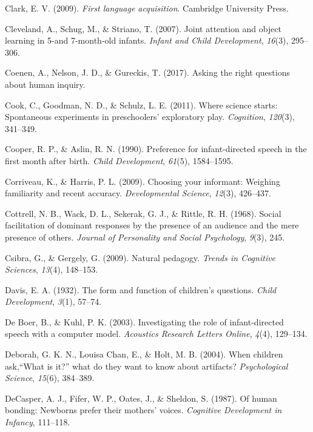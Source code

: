 \documentclass[english,floatsintext,man]{apa6}
\theoremstyle{definition}
\theoremstyle{definition}
\theoremstyle{definition}
\theoremstyle{remark}
\begin{document}
\hypertarget{ref-clark2009first}{}
Clark, E. V. (2009). \emph{First language acquisition}. Cambridge
University Press.

\hypertarget{ref-cleveland2007joint}{}
Cleveland, A., Schug, M., \& Striano, T. (2007). Joint attention and
object learning in 5-and 7-month-old infants. \emph{Infant and Child
Development}, \emph{16}(3), 295--306.

\hypertarget{ref-coenen2017asking}{}
Coenen, A., Nelson, J. D., \& Gureckis, T. (2017). Asking the right
questions about human inquiry.

\hypertarget{ref-cook2011science}{}
Cook, C., Goodman, N. D., \& Schulz, L. E. (2011). Where science starts:
Spontaneous experiments in preschoolers' exploratory play.
\emph{Cognition}, \emph{120}(3), 341--349.

\hypertarget{ref-cooper1990preference}{}
Cooper, R. P., \& Aslin, R. N. (1990). Preference for infant-directed
speech in the first month after birth. \emph{Child Development},
\emph{61}(5), 1584--1595.

\hypertarget{ref-corriveau2009choosing}{}
Corriveau, K., \& Harris, P. L. (2009). Choosing your informant:
Weighing familiarity and recent accuracy. \emph{Developmental Science},
\emph{12}(3), 426--437.

\hypertarget{ref-cottrell1968social}{}
Cottrell, N. B., Wack, D. L., Sekerak, G. J., \& Rittle, R. H. (1968).
Social facilitation of dominant responses by the presence of an audience
and the mere presence of others. \emph{Journal of Personality and Social
Psychology}, \emph{9}(3), 245.

\hypertarget{ref-csibra2009natural}{}
Csibra, G., \& Gergely, G. (2009). Natural pedagogy. \emph{Trends in
Cognitive Sciences}, \emph{13}(4), 148--153.

\hypertarget{ref-davis1932form}{}
Davis, E. A. (1932). The form and function of children's questions.
\emph{Child Development}, \emph{3}(1), 57--74.

\hypertarget{ref-de2003investigating}{}
De Boer, B., \& Kuhl, P. K. (2003). Investigating the role of
infant-directed speech with a computer model. \emph{Acoustics Research
Letters Online}, \emph{4}(4), 129--134.

\hypertarget{ref-deborah2004children}{}
Deborah, G. K. N., Louisa Chan, E., \& Holt, M. B. (2004). When children
ask,``What is it?'' what do they want to know about artifacts?
\emph{Psychological Science}, \emph{15}(6), 384--389.

\hypertarget{ref-decasper1987human}{}
DeCasper, A. J., Fifer, W. P., Oates, J., \& Sheldon, S. (1987). Of
human bonding: Newborns prefer their mothers' voices. \emph{Cognitive
Development in Infancy}, 111--118.
\end{document}
